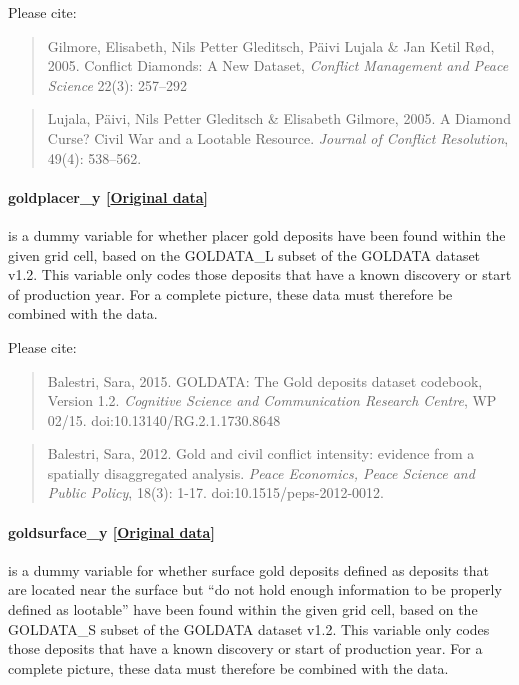 \documentclass[]{book}
\begin{document}
Please cite:

\begin{quote}
Gilmore, Elisabeth, Nils Petter Gleditsch, Päivi Lujala \& Jan Ketil
Rød, 2005. Conflict Diamonds: A New Dataset, \emph{Conflict Management
and Peace Science} 22(3): 257--292
\end{quote}

\begin{quote}
Lujala, Päivi, Nils Petter Gleditsch \& Elisabeth Gilmore, 2005. A
Diamond Curse? Civil War and a Lootable Resource. \emph{Journal of
Conflict Resolution}, 49(4): 538--562.
\end{quote}

\paragraph{goldplacer\_y
{[}\href{http://www.researchgate.net/profile/Sara_Balestri}{Original
data}{]}}\label{goldplacer-y}

is a dummy variable for whether placer gold deposits have been found
within the given grid cell, based on the GOLDATA\_L subset of the
GOLDATA dataset v1.2. This variable only codes those deposits that have
a known discovery or start of production year. For a complete picture,
these data must therefore be combined with the 
data.

Please cite:

\begin{quote}
Balestri, Sara, 2015. GOLDATA: The Gold deposits dataset codebook,
Version 1.2. \emph{Cognitive Science and Communication Research Centre},
WP 02/15. doi:10.13140/RG.2.1.1730.8648
\end{quote}

\begin{quote}
Balestri, Sara, 2012. Gold and civil conflict intensity: evidence from a
spatially disaggregated analysis. \emph{Peace Economics, Peace Science
and Public Policy}, 18(3): 1-17. doi:10.1515/peps-2012-0012.
\end{quote}

\paragraph{goldsurface\_y
{[}\href{http://www.researchgate.net/profile/Sara_Balestri}{Original
data}{]}}\label{goldsurface-y}

is a dummy variable for whether surface gold deposits defined as
deposits that are located near the surface but ``do not hold enough
information to be properly defined as lootable'' have been found within
the given grid cell, based on the GOLDATA\_S subset of the GOLDATA
dataset v1.2. This variable only codes those deposits that have a known
discovery or start of production year. For a complete picture, these
data must therefore be combined with the  data.
\end{document}
